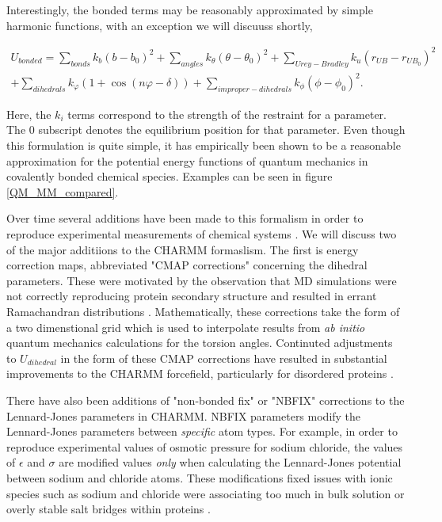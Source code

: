 Interestingly, the bonded terms may be reasonably approximated by simple harmonic functions, with an exception we will discuuss shortly, 

\begin{equation}\label{bonded_eqs}
	\begin{aligned}
	U_{bonded} = \sum_{bonds} k_{b} (b-b_0)^2 + \sum_{angles} k_\theta(\theta-\theta_0)^2+ \sum_{Urey-Bradley} k_u(r_{UB}-r_{UB_0})^2   \\ + \sum_{dihedrals} k_\varphi (1+\cos(n \varphi - \delta)) + \sum_{improper-dihedrals}  k_{\phi} (\phi - \phi_0)^2.
\end{aligned}
\end{equation}

Here, the $k_i$ terms correspond to the strength of the restraint for a parameter. The $0$ subscript denotes the equilibrium position for that parameter. Even though this formulation is quite simple, it has empirically been shown to be a reasonable approximation for the potential energy functions of quantum mechanics in covalently bonded chemical species. Examples can be seen in figure \ref{QM_MM_compared}.

Over time several additions have been made to this formalism in order to reproduce experimental measurements of chemical systems \cite{mackerelljr.2004}. We will discuss two of the major additiions to the CHARMM formaslism. The first is energy correction maps, abbreviated "CMAP corrections" concerning the dihedral parameters\cite{mackerell2004, mackerell2004a}. These were motivated by the observation that MD simulations were not correctly reproducing protein secondary structure and resulted in errant Ramachandran distributions \cite{ramachandran1963, mackerell2004}. Mathematically, these corrections take the form of a two dimenstional grid which is used to interpolate results from \textit{ab initio} quantum mechanics calculations for the torsion angles. Continuted adjustments to $U_{dihedral}$ in the form of these CMAP corrections have resulted in substantial improvements to the CHARMM forcefield, particularly for disordered proteins \cite{huang2017}. 

There have also been additions of "non-bonded fix" or "NBFIX"  corrections to the Lennard-Jones parameters in CHARMM. NBFIX parameters modify the Lennard-Jones parameters between \textit{specific} atom types. For example, in order to reproduce experimental values of osmotic pressure for sodium chloride, the values of $\epsilon$ and $\sigma$ are modified  values \textit{only} when calculating the Lennard-Jones potential between sodium and chloride atoms. These modifications fixed issues with ionic species such as sodium and chloride were associating too much in bulk solution or overly stable salt bridges within proteins \cite{yoo2018a, tolmachev2020, huang2017}.

